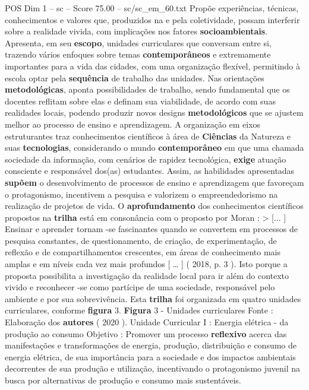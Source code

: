 \begin{textsample}{POS Dim 1 – sc – Score 75.00 – sc/sc\_em\_60.txt}
Propõe experiências, técnicas, conhecimentos e valores que, produzidos na e pela coletividade, possam interferir sobre a realidade vivida, com implicações nos fatores \textbf{socioambientais}.
Apresenta, em seu \textbf{escopo}, unidades curriculares que conversam entre si, trazendo vários enfoques sobre temas \textbf{contemporâneos} e extremamente importantes para a vida das cidades, com uma organização flexível, permitindo à escola optar pela \textbf{sequência} de trabalho das unidades.
Nas orientações \textbf{metodológicas}, aponta possibilidades de trabalho, sendo fundamental que os docentes reflitam sobre elas e definam sua viabilidade, de acordo com suas realidades locais, podendo produzir novos designs \textbf{metodológicos} que se ajustem melhor ao processo de ensino e aprendizagem.
A organização em eixos estruturantes traz conhecimentos científicos à área de \textbf{Ciências} da Natureza e suas \textbf{tecnologias}, considerando o mundo \textbf{contemporâneo} em que uma chamada sociedade da informação, com cenários de rapidez tecnológica, \textbf{exige} atuação consciente e responsável dos(as) estudantes.
Assim, as habilidades apresentadas \textbf{supõem} o desenvolvimento de processos de ensino e aprendizagem que favoreçam o protagonismo, incentivem a pesquisa e valorizem o empreendedorismo na realização de projetos de vida.
O \textbf{aprofundamento} dos conhecimentos científicos propostos na \textbf{trilha} está em consonância com o proposto por Moran : > [... ] Ensinar e aprender tornam -se fascinantes quando se convertem em processos de pesquisa constantes, de questionamento, de criação, de experimentação, de reflexão e de compartilhamentos crescentes, em áreas de conhecimento mais amplas e em níveis cada vez mais profundos [ … ] ( 2018, p. 3 ).
Isto porque a proposta possibilita a investigação da realidade local para ir além do contexto vivido e reconhecer -se como partícipe de uma sociedade, responsável pelo ambiente e por sua sobrevivência.
Esta \textbf{trilha} foi organizada em quatro unidades curriculares, conforme \textbf{figura} 3. \textbf{Figura} 3 - Unidades curriculares Fonte : Elaboração dos \textbf{autores} ( 2020 ).
Unidade Curricular I : Energia elétrica - da produção ao consumo Objetivo : Promover um processo \textbf{reflexivo} acerca das manifestações e transformações de energia, produção, distribuição e consumo de energia elétrica, de sua importância para a sociedade e dos impactos ambientais decorrentes de sua produção e utilização, incentivando o protagonismo juvenil na busca por alternativas de produção e consumo mais sustentáveis.

\end{textsample}
